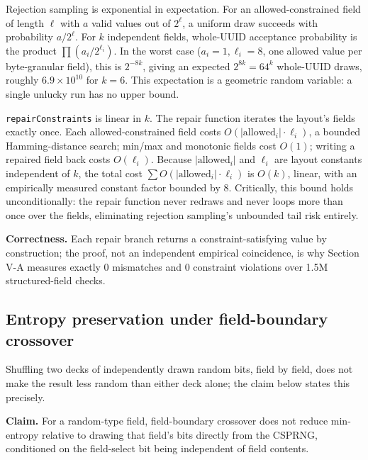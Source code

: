 \documentclass[conference]{IEEEtran}
\begin{document}
Rejection sampling is exponential in expectation. For an allowed-constrained field of length $\ell$ with $a$ valid values out of $2^\ell$, a uniform draw succeeds with probability $a / 2^\ell$. For $k$ independent fields, whole-UUID acceptance probability is the product $\prod (a_i / 2^{\ell_i})$. In the worst case ($a_i = 1, \ell_i = 8$, one allowed value per byte-granular field), this is $2^{-8k}$, giving an expected $2^{8k} = 64^k$ whole-UUID draws, roughly $6.9 \times 10^{10}$ for $k=6$. This expectation is a geometric random variable: a single unlucky run has no upper bound.

\texttt{repairConstraints} is linear in $k$. The repair function iterates the layout's fields exactly once. Each allowed-constrained field costs $O(|\text{allowed}_i| \cdot \ell_i)$, a bounded Hamming-distance search; min/max and monotonic fields cost $O(1)$; writing a repaired field back costs $O(\ell_i)$. Because $|\text{allowed}_i|$ and $\ell_i$ are layout constants independent of $k$, the total cost $\sum O(|\text{allowed}_i| \cdot \ell_i)$ is $O(k)$, linear, with an empirically measured constant factor bounded by 8. Critically, this bound holds unconditionally: the repair function never redraws and never loops more than once over the fields, eliminating rejection sampling's unbounded tail risk entirely.

\textbf{Correctness.} Each repair branch returns a constraint-satisfying value by construction; the proof, not an independent empirical coincidence, is why Section V-A measures exactly 0 mismatches and 0 constraint violations over 1.5M structured-field checks.

\subsection{Entropy preservation under field-boundary crossover}

Shuffling two decks of independently drawn random bits, field by field, does not make the result less random than either deck alone; the claim below states this precisely.

\textbf{Claim.} For a random-type field, field-boundary crossover does not reduce min-entropy relative to drawing that field's bits directly from the CSPRNG, conditioned on the field-select bit being independent of field contents.
\end{document}
